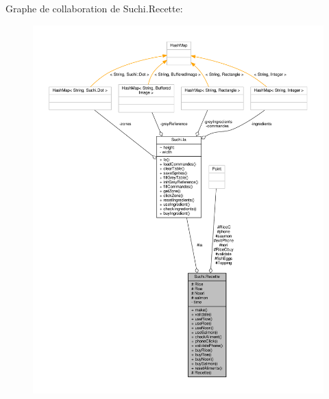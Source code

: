 Graphe de collaboration de Suchi.\+Recette\+:\nopagebreak
\begin{figure}[H]
\begin{center}
\leavevmode
\includegraphics[width=350pt]{classSuchi_1_1Recette__coll__graph}
\end{center}
\end{figure}
